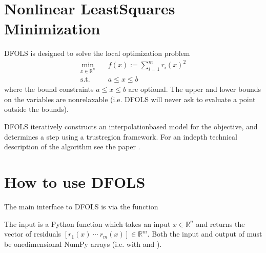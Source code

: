 \documentclass[letterpaper,10pt,english]{sphinxmanual}
\begin{document}
\section{Nonlinear Least\sphinxhyphen{}Squares Minimization}
\label{\detokenize{userguide:nonlinear-least-squares-minimization}}
DFO\sphinxhyphen{}LS is designed to solve the local optimization problem
\begin{equation*}
\begin{split}\min_{x\in\mathbb{R}^n}  &\quad  f(x) := \sum_{i=1}^{m}r_{i}(x)^2 \\
\text{s.t.} &\quad  a \leq x \leq b\end{split}
\end{equation*}
where the bound constraints \(a \leq x \leq b\) are optional. The upper and lower bounds on the variables are non\sphinxhyphen{}relaxable (i.e. DFO\sphinxhyphen{}LS will never ask to evaluate a point outside the bounds).

DFO\sphinxhyphen{}LS iteratively constructs an interpolation\sphinxhyphen{}based model for the objective, and determines a step using a trust\sphinxhyphen{}region framework.
For an in\sphinxhyphen{}depth technical description of the algorithm see the paper .


\section{How to use DFO\sphinxhyphen{}LS}
\label{\detokenize{userguide:how-to-use-dfo-ls}}
The main interface to DFO\sphinxhyphen{}LS is via the function 
\begin{quote}

\begin{sphinxVerbatim}[commandchars=\\\{\}]
   
\end{sphinxVerbatim}
\end{quote}

The input  is a Python function which takes an input \(x\in\mathbb{R}^n\) and returns the vector of residuals \([r_1(x)\: \cdots \: r_m(x)]\in\mathbb{R}^m\). Both the input and output of  must be one\sphinxhyphen{}dimensional NumPy arrays (i.e. with  and ).
\end{document}

